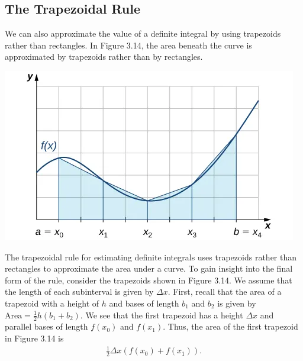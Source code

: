 \documentclass{report}
\begin{document}
         \pagebreak \bigbreak \noindent 
         \subsection*{The Trapezoidal Rule}
         \bigbreak \noindent 
         \begin{minipage}[t]{0.47\textwidth}
             We can also approximate the value of a definite integral by using trapezoids rather than rectangles. In Figure 3.14, the area beneath the curve is approximated by trapezoids rather than by rectangles.
         \end{minipage}
         \begin{minipage}[]{0.47\textwidth}
            \bigbreak \noindent 
            \begin{center}
                \includegraphics[scale=0.5]{./figures/pic2.png}
            \end{center}
         \end{minipage}
         \bigbreak \noindent 
         The trapezoidal rule for estimating definite integrals uses trapezoids rather than rectangles to approximate the area under a curve. To gain insight into the final form of the rule, consider the trapezoids shown in Figure 3.14. We assume that the length of each subinterval is given by $\Delta x$.
        First, recall that the area of a trapezoid with a height of $h$ and bases of length $b_1$ and $b_2$ is given by $\text{Area} = \frac{1}{2} h (b_1 + b_2)$.
        We see that the first trapezoid has a height $\Delta x$ and parallel bases of length $f(x_0)$ and $f(x_1)$. Thus, the area of the first trapezoid in Figure 3.14 is
        \begin{align*}
            \frac{1}{2}\Delta x(f(x_{0}) + f(x_{1}))
        .\end{align*}
\end{document}
